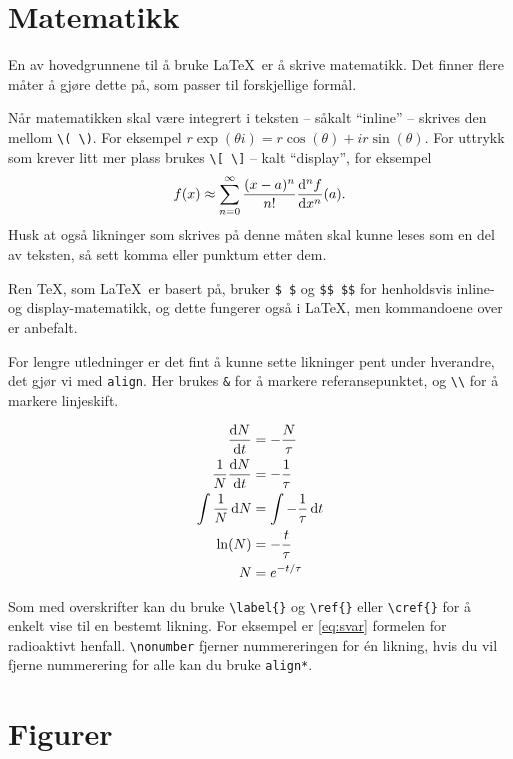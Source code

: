 \section{Matematikk}\label{ov:matte}

En av hovedgrunnene til å bruke \LaTeX\ er å skrive matematikk. Det finner flere måter å
gjøre dette på, som passer til forskjellige formål.

Når matematikken skal være integrert i teksten -- såkalt ``inline'' -- skrives den mellom
\lstinline{\( \)}. For eksempel \(r\exp(\theta i) = r\cos(\theta) + ir\sin(\theta)\). For
uttrykk som krever litt mer plass brukes \lstinline{\[ \]} -- kalt ``display'', for eksempel
\[
	f(x) \approx \sum_{n=0}^{\infty} \frac{(x-a)^n}{n!}\dv[n]{f}{x}\qty(a) .
\]
Husk at også likninger som skrives på denne måten skal kunne leses som en del av teksten, så
sett komma eller punktum etter dem.


Ren \TeX, som \LaTeX\ er basert på, bruker \lstinline{$ $} og \lstinline{$$ $$} for henholdsvis
inline- og display-matematikk, og dette fungerer også i \LaTeX, men kommandoene over er anbefalt.

For lengre utledninger er det fint å kunne sette likninger pent under hverandre, det gjør vi
med \lstinline$align$. Her brukes \lstinline{&} for å markere referansepunktet, og \lstinline{\\}
for å markere linjeskift.

\begin{align}
	\dv{N}{t} &= -\frac{N}{\tau}  \label{eq:difflikning} \\
	\frac{1}{N}\dv{N}{t} &= -\frac{1}{\tau}  \nonumber \\
	\int \frac{1}{N} \dd{N} &= \int -\frac{1}{\tau} \dd{t} \\
	\ln(N) &= -\frac{t}{\tau}  \nonumber \\
	N &= e^{-t/\tau} \label{eq:svar}
\end{align}

Som med overskrifter kan du bruke \lstinline$\label{}$ og \lstinline$\ref{}$ eller
\lstinline$\cref{}$ for å enkelt vise til en bestemt likning.
For eksempel er \cref{eq:svar} formelen for radioaktivt henfall.
\lstinline$\nonumber$ fjerner nummereringen for én likning, hvis du vil fjerne nummerering
for alle kan du bruke \lstinline$align*$.

\section{Figurer}

